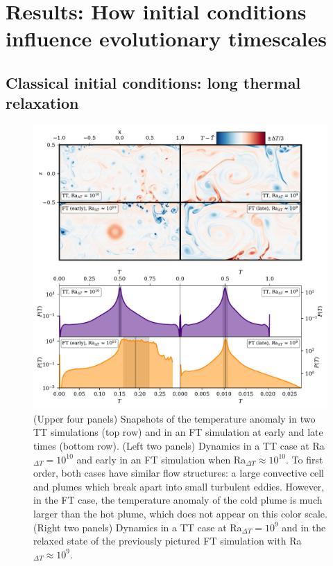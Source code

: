 \documentclass[aps, pre, onecolumn, nofootinbib, notitlepage, groupedaddress, amsfonts, amssymb, amsmath, longbibliography, superscriptaddress]{revtex4-1}
\begin{document}
\section{Results: How initial conditions influence evolutionary timescales}
\label{sec:results_timescales}

\subsection{Classical initial conditions: long thermal relaxation}
\label{sec:time_evolution_classic_ICs}

\begin{figure}[p!]
\includegraphics[width=\textwidth]{./figs/rbc_evolution_dynamics.pdf}
\caption{ 
	(Upper four panels) Snapshots of the temperature anomaly in two TT simulations (top row) and in an FT simulation at early and late times (bottom row).
	(Left two panels) Dynamics in a TT case at Ra$_{\Delta T} = 10^{10}$ and early in an FT simulation when Ra$_{\Delta T} \approx 10^{10}$.
	To first order, both cases have similar flow structures: a large convective cell and plumes which break apart into small turbulent eddies.
	However, in the FT case, the temperature anomaly of the cold plume is much larger than the hot plume, which does not appear on this color scale.
	(Right two panels) Dynamics in a TT case at Ra$_{\Delta T} = 10^9$ and in the relaxed state of the previously pictured FT simulation with Ra$_{\Delta T} \approx 10^9$.
}
\end{figure}
\end{document}
